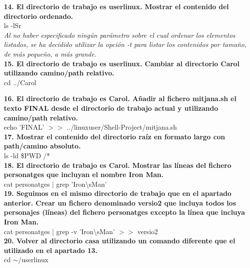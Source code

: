 \documentclass[spanish]{article}
\begin{document}
\textbf{14. El directorio de trabajo es userlinux. Mostrar el
contenido del directorio ordenado.}\\

ls -lSr\\

\textit{Al no haber especificado ningún parámetro sobre el
cual ordenar los elementos listados, se ha decidido utilizar
la opción -t para listar los contenidos por tamaño, de más
pequeño, a más grande.}\\

\textbf{15. El directorio de trabajo es userlinux. Cambiar al
directorio Carol utilizando camino/path relativo.}\\

cd ../Carol\\

\newpage

\textbf{16. El directorio de trabajo es Carol. Añadir al
fichero mitjana.sh el texto FINAL desde el directorio de
trabajo actual y utilizando camino/path relativo.}\\

echo 'FINAL' \(>>\) ../linuxuser/Shell-Project/mitjana.sh\\

\textbf{17. Mostrar el contenido del directorio raíz en formato
largo con path/camino absoluto.}\\

ls -ld \$PWD /*\\

\textbf{18. El directorio de trabajo es Carol. Mostrar las
líneas del fichero personatges que incluyan el nombre Iron
Man.}\\

cat personatges $\vert$ grep 'Iron\textbackslash sMan'\\

\textbf{19. Seguimos en el mismo directorio de trabajo que en el
apartado anterior. Crear un fichero denominado versio2 que
incluya todos los personajes (líneas) del fichero
personatges excepto la línea que incluya Iron Man.}\\

cat personatges  $\vert$ grep -v 'Iron\textbackslash sMan' \(>>\)
versio2\\

\textbf{20. Volver al directorio casa utilizando un comando
diferente que el utilizado en el apartado 13.}\\

cd $\sim$/userlinux\\
\end{document}
